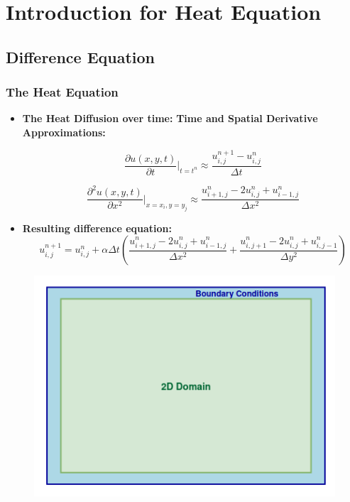 \documentclass[9pt]{beamer}
\begin{document}
\section{Introduction for Heat Equation} %
\subsection{Difference Equation}
\begin{frame}
\vspace{-0.1\baselineskip} %

\frametitle{The Heat Equation}
\scriptsize
\begin{itemize}
    \item \textbf{The Heat Diffusion over time:}
\newline %
\textbf{Time and Spatial Derivative Approximations:}
\newline
\begin{minipage}{0.45\textwidth}

     \[
\frac{\partial u(x, y, t)}{\partial t}\Bigg|_{t = t^n} \approx \frac{u_{i,j}^{n+1} - u_{i,j}^n}{\Delta t}
\]
\end{minipage}
\begin{minipage}{0.45\textwidth}

\[
\frac{\partial^2 u(x, y, t)}{\partial x^2}\Bigg|_{x = x_i, y = y_j} \approx \frac{u_{i+1,j}^n - 2u_{i,j}^n + u_{i-1,j}^n}{\Delta x^2}
\]
\end{minipage}
\item \textbf{Resulting difference equation:}
\[
u_{i,j}^{n+1} = u_{i,j}^n + \alpha \Delta t \left( \frac{u_{i+1,j}^n - 2u_{i,j}^n + u_{i-1,j}^n}{\Delta x^2} + \frac{u_{i,j+1}^n - 2u_{i,j}^n + u_{i,j-1}^n}{\Delta y^2} \right)
\]
\end{itemize}
\vspace{-0.5\baselineskip}
\begin{figure}
    \centering
    \includegraphics[width=0.50\linewidth,height=0.30\linewidth]{Screenshot from 2024-08-30 14-04-56.png}
\end{figure}
\end{frame}
\end{document}
